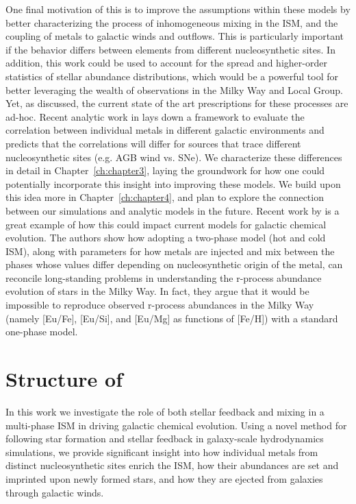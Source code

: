 One final motivation of this \dissertation is to improve the assumptions within these models by better characterizing the process of inhomogeneous mixing in the ISM, and the coupling of metals to galactic winds and outflows. This is particularly important if the behavior differs between elements from different nucleosynthetic sites. In addition, this work could be used to account for the spread and higher-order statistics of stellar abundance distributions, which would be a powerful tool for better leveraging the wealth of observations in the Milky Way and Local Group. Yet, as discussed, the current state of the art prescriptions for these processes are ad-hoc. Recent analytic work in \cite{KrumholzTing2018} lays down a framework to evaluate the correlation between individual metals in different galactic environments and predicts that the correlations will differ for sources that trace different nucleosynthetic sites (e.g. AGB wind vs. SNe). We characterize these differences in detail in Chapter~\ref{ch:chapter3}, laying the groundwork for how one could potentially incorporate this insight into improving these models. We build upon this idea more in Chapter~\ref{ch:chapter4}, and plan to explore the connection between our simulations and analytic models in the future. Recent work by \cite{SchonrichWeinberg2019} is a great example of how this could impact current models for galactic chemical evolution. The authors show how adopting a two-phase model (hot and cold ISM), along with parameters for how metals are injected and mix between the phases whose values differ depending on nucleosynthetic origin of the metal, can reconcile long-standing problems in understanding the r-process abundance evolution of stars in the Milky Way. In fact, they argue that it would be impossible to reproduce observed r-process abundances in the Milky Way (namely [Eu/Fe], [Eu/Si], and [Eu/Mg] as functions of [Fe/H]) with a standard one-phase model.


\section{Structure of \dissertation}\label{intro:sec:structure}
\label{intro:sec:structure}

In this work we investigate the role of both stellar feedback and mixing in a multi-phase ISM in driving galactic chemical evolution. Using a novel method for following star formation and stellar feedback in galaxy-scale hydrodynamics simulations, we provide significant insight into how individual metals from distinct nucleosynthetic sites enrich the ISM, how their abundances are set and imprinted upon newly formed stars, and how they are ejected from galaxies through galactic winds.

